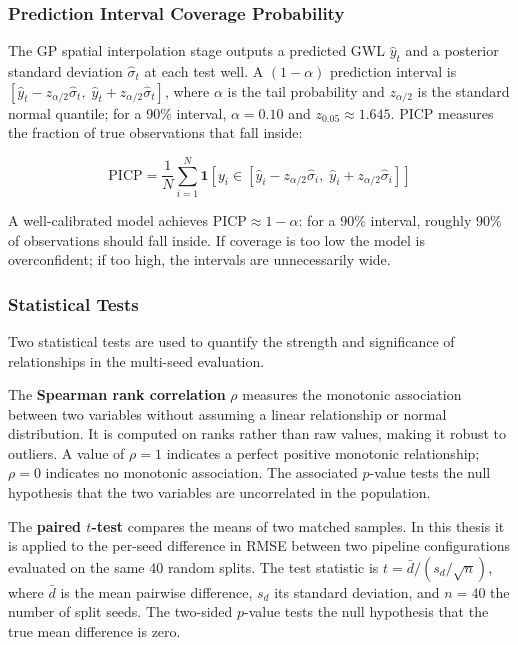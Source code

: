 \subsubsection{Prediction Interval Coverage Probability}

The GP spatial interpolation stage outputs a predicted GWL $\hat{y}_t$ and a posterior standard deviation $\hat{\sigma}_t$ at each test well. A $(1-\alpha)$ prediction interval is $[\hat{y}_t - z_{\alpha/2}\hat{\sigma}_t,\; \hat{y}_t + z_{\alpha/2}\hat{\sigma}_t]$, where $\alpha$ is the tail probability and $z_{\alpha/2}$ is the standard normal quantile; for a 90\% interval, $\alpha = 0.10$ and $z_{0.05} \approx 1.645$. PICP measures the fraction of true observations that fall inside:

\begin{equation}
  \text{PICP} = \frac{1}{N}\sum_{i=1}^{N} \mathbf{1}\!\left[y_i \in [\hat{y}_i - z_{\alpha/2}\hat{\sigma}_i,\; \hat{y}_i + z_{\alpha/2}\hat{\sigma}_i]\right]
\end{equation}

A well-calibrated model achieves $\text{PICP} \approx 1-\alpha$: for a 90\% interval, roughly 90\% of observations should fall inside. If coverage is too low the model is overconfident; if too high, the intervals are unnecessarily wide.

\subsubsection{Statistical Tests}
\label{sec:statistical_tests}

Two statistical tests are used to quantify the strength and significance of relationships in the multi-seed evaluation.

The \textbf{Spearman rank correlation} $\rho$ measures the monotonic association between two variables without assuming a linear relationship or normal distribution. It is computed on ranks rather than raw values, making it robust to outliers. A value of $\rho = 1$ indicates a perfect positive monotonic relationship; $\rho = 0$ indicates no monotonic association. The associated $p$-value tests the null hypothesis that the two variables are uncorrelated in the population.

The \textbf{paired $t$-test} compares the means of two matched samples. In this thesis it is applied to the per-seed difference in RMSE between two pipeline configurations evaluated on the same 40 random splits. The test statistic is $t = \bar{d} / (s_d / \sqrt{n})$, where $\bar{d}$ is the mean pairwise difference, $s_d$ its standard deviation, and $n = 40$ the number of split seeds. The two-sided $p$-value tests the null hypothesis that the true mean difference is zero.

